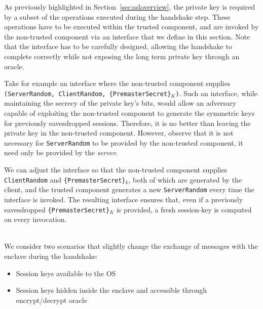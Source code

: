 \documentclass[../main.tex]{subfiles}
\begin{document}
As previously highlighted in Section~\ref{sec:ssloverview}, the
private key is required by a subset of the operations executed during
the handshake step. These operations have to be executed within the
trusted component, and are invoked by the non-trusted component via an
interface that we define in this section. Note that the interface has
to be carefully designed, allowing the handshake to complete correctly
while not exposing the long term private key through an oracle.



Take for example an interface where the non-trusted component supplies
\texttt{(ServerRandom, ClientRandom, \{PremasterSecret\}$_K$)}. Such
an interface, while maintaining the secrecy of the private key's bits,
would allow an adversary capable of exploiting the non-trusted
component to generate the symmetric keys for previously eavesdropped
sessions. Therefore, it is no better than leaving the private key in
the non-trusted component.  However, observe that it is not necessary
for \texttt{ServerRandom} to be provided by the non-trusted component,
it need only be provided by the \textit{server}.


We can adjust the interface so that the non-trusted component supplies
\texttt{ClientRandom} and \texttt{\{PremasterSecret\}$_k$}, both of
which are generated by the client, and the trusted component generates
a new \texttt{ServerRandom} every time the interface is invoked. The
resulting interface ensures that, even if a previously eavesdropped
\texttt{\{PremasterSecret\}$_K$} is provided, a fresh session-key is
computed on every invocation.




\noindent
\\We consider two scenarios that slightly change the exchange of
messages with the enclave during the handshake:
\begin{itemize}
  \item Session keys available to the OS
  \item Session keys hidden inside the enclave and accessible through
    encrypt/decrypt oracle
\end{itemize}
\end{document}
